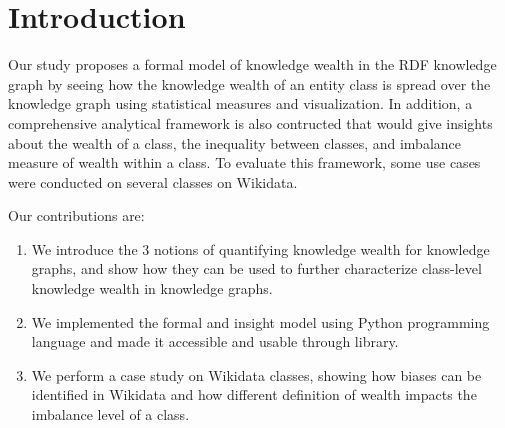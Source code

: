 \section{Introduction}






Our study proposes a formal model of knowledge wealth in the RDF knowledge graph by seeing how the knowledge wealth of an entity class is spread over the knowledge graph using statistical measures and visualization. In addition, a comprehensive analytical framework is also contructed that would give insights about the wealth of a class, the inequality between classes, and imbalance measure of wealth within a class. To evaluate this framework, some use cases were conducted on several classes on Wikidata.

Our contributions are:
\begin{enumerate}
    \item We introduce the 3 notions of quantifying knowledge wealth for knowledge graphs, and show how they can be used to further characterize class-level knowledge wealth in knowledge graphs.
    \item We implemented the formal and insight model using Python programming language and made it accessible and usable through library.
    \item We perform a case study on Wikidata classes, showing how biases can be identified in Wikidata and how different definition of wealth impacts the imbalance level of a class.
\end{enumerate}